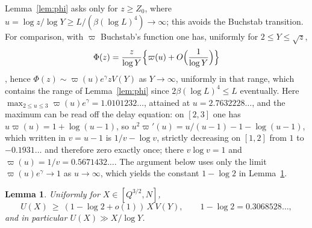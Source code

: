 \documentclass[11pt,a4paper]{article}
\theoremstyle{plain}
\newtheorem{lemma}[theorem]{Lemma}
\theoremstyle{definition}
\theoremstyle{remark}
\begin{document}
Lemma~\ref{lem:phi} asks only for $z\ge Z_{0}$, where $u=\log z/\log Y\ge L/(\beta(\log L)^{4})\to\infty$;
this avoids the Buchstab transition. For comparison, with $\varpi$ Buchstab's
function one has, uniformly for $2\le Y\le\sqrt z$,
\[
  \Phi(z)=\frac z{\log Y}\Bigl\{\varpi(u)+O\Bigl(\frac1{\log Y}\Bigr)\Bigr\}
\]
\cite[ch.~III.6]{TenenbaumBook}, hence $\Phi(z)\sim\varpi(u)e^{\gamma}zV(Y)$ as $Y\to\infty$, uniformly in
that range, which contains the range of Lemma~\ref{lem:phi} since $2\beta(\log L)^{4}\le L$
eventually. Here $\max_{2\le u\le3}\varpi(u)e^{\gamma}=1.0101232\ldots$, attained at
$u=2.7632228\ldots$, and the maximum can be read off the delay equation: on $[2,3]$ one has
$u\varpi(u)=1+\log(u-1)$, so $u^{2}\varpi'(u)=u/(u-1)-1-\log(u-1)$, which written in $v=u-1$ is
$1/v-\log v$, strictly decreasing on $[1,2]$ from $1$ to $-0.1931\ldots$ and therefore zero exactly once;
there $v\log v=1$ and $\varpi(u)=1/v=0.5671432\ldots$. The argument below uses only the limit $\varpi(u)e^{\gamma}\to1$ as $u\to\infty$,
which yields the constant $1-\log2$ in Lemma~\ref{lem:U}.

\begin{lemma}\label{lem:U}
Uniformly for $X\in[Q^{3/2},N]$,
\[
  U(X)\ \ge\ (1-\log2+o(1))\,X\,V(Y),\qquad 1-\log2=0.3068528\ldots,
\]
and in particular $U(X)\gg X/\log Y$.
\end{lemma}
\end{document}
